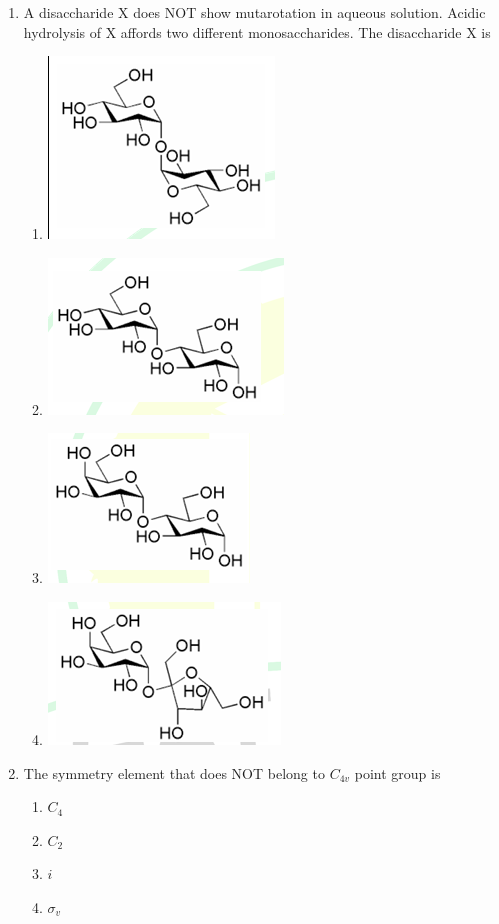 \documentclass[journal,12pt,onecolumn]{IEEEtran}
\theoremstyle{remark}
\begin{document}
\begin{enumerate}
\item A disaccharide X does NOT show mutarotation in aqueous solution. Acidic hydrolysis of X affords two different monosaccharides. The disaccharide X is
 \begin{multicols}{2}
    \begin{enumerate}
        \item \includegraphics[width=0.25\columnwidth]{figs/q17a.png}
        \item \includegraphics[width=0.25\columnwidth]{figs/q17b.png}
        \item \includegraphics[width=0.25\columnwidth]{figs/q17c.png}
        \item \includegraphics[width=0.25\columnwidth]{figs/q17d.png}
    \end{enumerate}      \hfill{}
    \end{multicols}



\item The symmetry element that does NOT belong to $C_{4v}$ point group is
    \begin{enumerate}
        \item $C_{4}$
        \item $C_{2}$
        \item $i$
        \item $\sigma_{v}$
    \end{enumerate}      \hfill{}




\end{enumerate}
\end{document}
